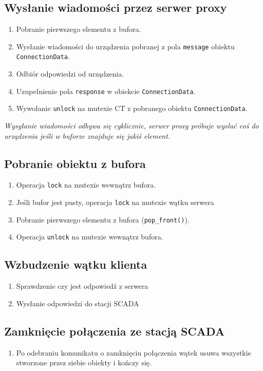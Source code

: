 \documentclass[a4paper]{article}
\begin{document}
\subsection{Wysłanie wiadomości przez serwer proxy}
\begin{enumerate}
\item Pobranie pierwszego elementu z bufora.
\item Wysłanie wiadomości do urządzenia pobranej z pola \texttt{message} obiektu \texttt{ConnectionData}.
\item Odbiór odpowiedzi od urządzenia.
\item Uzupełnienie pola \texttt{response} w obiekcie \texttt{ConnectionData}.
\item Wywołanie \texttt{unlock} na mutexie CT z pobranego obiektu \texttt{ConnectionData}.
\end{enumerate}

\textit{Wysyłanie wiadomości odbywa się cyklicznie, serwer proxy próbuje wysłać coś do urządzenia jeśli w buforze znajduje się jakiś element.}

\subsection{Pobranie obiektu z bufora}
\begin{enumerate}
\item Operacja \texttt{lock} na mutexie wewnątrz bufora.
\item Jeśli bufor jest pusty, operacja \texttt{lock} na mutexie wątku serwera
\item Pobranie pierwszego elementu z bufora (\texttt{pop\_front()}).
\item Operacja \texttt{unlock} na mutexie wewnątrz bufora.
\end{enumerate}

\subsection{Wzbudzenie wątku klienta}
\begin{enumerate}
\item Sprawdzenie czy jest odpowiedź z serwera
\item Wysłanie odpowiedzi do stacji SCADA
\end{enumerate}

\subsection{Zamknięcie połączenia ze stacją SCADA}
\begin{enumerate}
\item Po odebraniu komunikatu o zamknięciu połączenia wątek usuwa wszystkie stworzone przez siebie obiekty i kończy się.
\end{enumerate}
\end{document}
